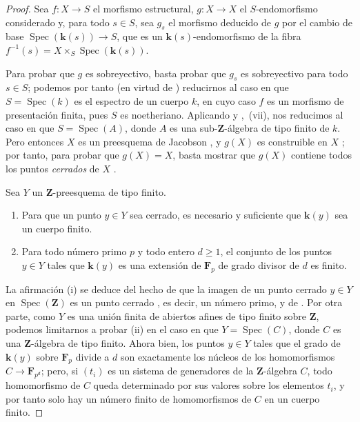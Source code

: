 \begin{proof}
Sea $f:X\to S$ el morfismo estructural, $g:X\to X$ el $S$-endomorfismo considerado y, para todo $s\in S$, sea $g_s$ el morfismo deducido de $g$ por el cambio de base $\operatorname{Spec}(\boldsymbol{k}(s))\to S$, que es un $\boldsymbol k(s)$-endomorfismo de la fibra $f^{-1}(s)=X\times_S\operatorname{Spec}(\boldsymbol k(s))$.

Para probar que $g$ es sobreyectivo, basta probar que $g_s$ es sobreyectivo para todo $s\in S$; podemos por tanto (en virtud de ) reducirnos al caso en que $S=\operatorname{Spec}(k)$ es el espectro de un cuerpo $k$, en cuyo caso $f$ es un morfismo de presentación finita, pues $S$ es noetheriano.
Aplicando  y ,~(vii), nos reducimos al caso en que $S=\operatorname{Spec}(A)$, donde $A$ es una sub-$\mathbf{Z}$-álgebra de tipo finito de $k$.
Pero entonces $X$ es un preesquema de Jacobson , y $g(X)$ es construible en $X$ ; por tanto, para probar que $g(X)=X$, basta mostrar que $g(X)$ contiene todos los puntos \emph{cerrados} de $X$ .

\begin{lemma}[10.4.11.1]
\label{IV.10.4.11.1}
Sea $Y$ un $\mathbf{Z}$-preesquema de tipo finito.
\begin{enumerate}[label=\textup{(\roman*)}]
  \item Para que un punto $y\in Y$ sea cerrado, es necesario y suficiente que $\boldsymbol k(y)$ sea un cuerpo finito.
  \item Para todo número primo $p$ y todo entero $d\geq 1$, el conjunto de los puntos $y\in Y$ tales que $\boldsymbol k(y)$ es una extensión de $\mathbf{F}_p$ de grado divisor de $d$ es finito.
\end{enumerate}
\end{lemma}

La afirmación (i) se deduce del hecho de que la imagen de un punto cerrado $y\in Y$ en $\operatorname{Spec}(\mathbf{Z})$ es un punto cerrado , es decir, un número primo, y de .
Por otra parte, como $Y$ es una unión finita de abiertos afines de tipo finito sobre $\mathbf{Z}$, podemos limitarnos a probar (ii) en el caso en que $Y=\operatorname{Spec}(C)$, donde $C$ es una $\mathbf{Z}$-álgebra de tipo finito.
Ahora bien, los puntos $y\in Y$ tales que el grado de $\boldsymbol k(y)$ sobre $\mathbf{F}_p$ divide a $d$ son exactamente los núcleos de los homomorfismos $C\to\mathbf{F}_{p^d}$; pero, si $(t_i)$ es un sistema de generadores de la $\mathbf{Z}$-álgebra $C$, todo homomorfismo de $C$ queda determinado por sus valores sobre los elementos $t_i$, y por tanto solo hay un número finito de homomorfismos de $C$ en un cuerpo finito.


\end{proof}
